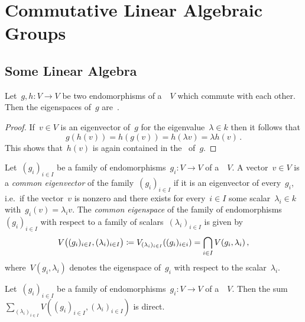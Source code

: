 \section{Commutative Linear Algebraic Groups}





\subsection{Some Linear Algebra}


\begin{lemma}
  Let~$g, h \colon V \to V$ be two endomorphisms of a~{\kvs}~$V$ which commute with each other.
  Then the eigenspaces of~$g$ are~.
\end{lemma}


\begin{proof}
  If~$v \in V$ is an eigenvector of~$g$ for the eigenvalue~$\lambda \in k$ then it follows that
  \[
      g(h(v))
    = h(g(v))
    = h(\lambda v)
    = \lambda h(v) \,.
  \]
  This shows that~$h(v)$ is again contained in the~ of~$g$.
\end{proof}


\begin{definition}
  Let~$(g_i)_{i \in I}$ be a family of endomorphisms~$g_i \colon V \to V$ of a~{\kvs}~$V$.
  A vector~$v \in V$ is a \emph{common eigenvector} of the family~$(g_i)_{i \in I}$ if it is an eigenvector of every~$g_i$, i.e.\ if the vector~$v$ is nonzero and there exists for every~$i \in I$ some scalar~$\lambda_i \in k$ with~$g_i(v) = \lambda_i v$.
  The \emph{common eigenspace} of the family of endomorphisms~$(g_i)_{i \in I}$ with respect to a family of scalars~$(\lambda_i)_{i \in I}$ is given by
  \[
              V\bigl( (g_i)_{i \in I}, (\lambda_i)_{i \in I} \bigr)
    \coloneqq  V_{(\lambda_i)_{i \in I}}( (g_i)_{i \in i})
    =         \bigcap_{i \in I} V(g_i, \lambda_i) \,,
  \]
  where~$V(g_i, \lambda_i)$ denotes the eigenspace of~$g_i$ with respect to the scalar~$\lambda_i$.
\end{definition}


\begin{lemma}
  Let~$(g_i)_{i \in I}$ be a family of endomorphisms~$g_i \colon V \to V$ of a~{\kvs}~$V$.
  Then the sum~$\sum_{(\lambda_i)_{i \in I}} V((g_i)_{i \in I}, (\lambda_i)_{i \in I})$ is direct.
\end{lemma}


